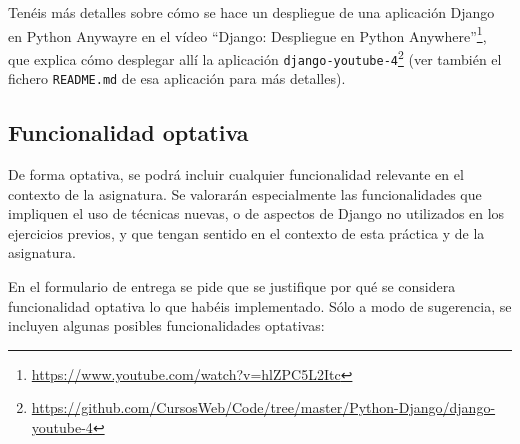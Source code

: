 Tenéis más detalles sobre cómo se hace un despliegue de una aplicación Django en Python Anywayre en el vídeo ``Django: Despliegue en Python Anywhere''\footnote{\url{https://www.youtube.com/watch?v=hlZPC5L2Itc}}, que explica cómo desplegar allí la aplicación \texttt{django-youtube-4}\footnote{\url{https://github.com/CursosWeb/Code/tree/master/Python-Django/django-youtube-4}} (ver también el fichero \texttt{README.md} de esa aplicación para más detalles).

\subsection{Funcionalidad optativa}

De forma optativa, se podrá incluir cualquier funcionalidad relevante en el contexto de la asignatura. Se valorarán especialmente las funcionalidades que impliquen el uso de técnicas nuevas, o de aspectos de Django no utilizados en los ejercicios previos, y que tengan sentido en el contexto de esta práctica y de la asignatura.

En el formulario de entrega se pide que se justifique por qué se considera funcionalidad optativa lo que habéis implementado. Sólo a modo de sugerencia, se incluyen algunas posibles funcionalidades optativas:

